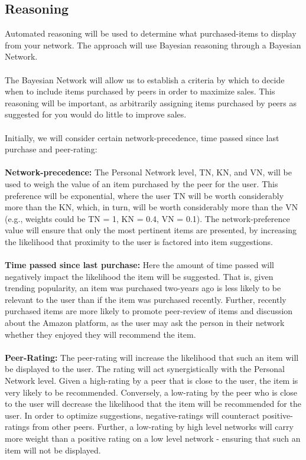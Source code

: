\documentclass[12pt,a4paper]{article}
\begin{document}
	\subsection*{Reasoning}
		Automated reasoning will be used to determine what purchased-items to display from your network. The approach will use Bayesian reasoning through a Bayesian Network. 
		\\\\
		The Bayesian Network will allow us to establish a criteria by which to decide when to include items purchased by peers in order to maximize sales. This reasoning will be important, as arbitrarily assigning items purchased by peers as suggested for you would do little to improve sales. 
		\\\\
		Initially, we will consider certain network-precedence, time passed since last purchase and peer-rating: 
		\\\\
		\textbf{Network-precedence:} The Personal Network level, TN, KN, and VN, will be used to weigh the value of an item purchased by the peer for the user. This preference will be exponential, where the user TN will be worth considerably more than the KN, which, in turn, will be worth considerably more than the VN (e.g., weights could be TN = 1, KN = 0.4, VN = 0.1). The network-preference value will ensure that only the most pertinent items are presented, by increasing the likelihood that proximity to the user is factored into item suggestions. 
		\\\\
		\textbf{Time passed since last purchase:} Here the amount of time passed will negatively impact the likelihood the item will be suggested. That is, given trending popularity, an item was purchased two-years ago is less likely to be relevant to the user than if the item was purchased recently. Further, recently purchased items are more likely to promote peer-review of items and discussion about the Amazon platform, as the user may ask the person in their network whether they enjoyed they will recommend the item. 
		\\\\
		\textbf{Peer-Rating:} The peer-rating will increase the likelihood that such an item will be displayed to the user. The rating will act synergistically with the Personal Network level. Given a high-rating by a peer that is close to the user, the item is very likely to be recommended. Conversely, a low-rating by the peer who is close to the user will decrease the likelihood that the item will be recommended for the user. In order to optimize suggestions, negative-ratings will counteract positive-ratings from other peers. Further, a low-rating by high level networks will carry more weight than a positive rating on a low level network - ensuring that such an item will not be displayed. 
\end{document}
